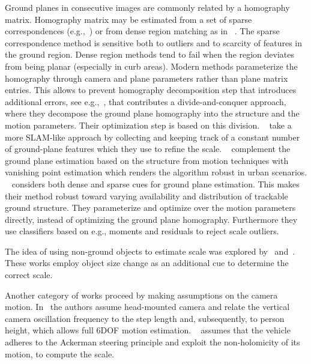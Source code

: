Ground planes in consecutive images are commonly related by a
homography matrix. Homography matrix may be estimated from a set of
sparse correspondences (e.g.,~\cite{song2014robust}) or from dense
region matching as in ~\cite{7995955}.  The sparse correspondence
method is sensitive both to outliers and to scarcity of features in
the ground region.  Dense region methods tend to fail when the region
deviates from being planar (especially in curb areas). Modern methods
parameterize the homography through camera and plane parameters rather
than plane matrix entries.  This allows to prevent homography
decomposition step that introduces additional errors, see
e.g.,~\cite{zhou2016reliable}, that contributes a divide-and-conquer
approach, where they decompose the ground plane homography into the
structure and the motion parameters.  Their optimization step is based
on this division.  ~\cite{kitt2011monocular} take a more SLAM-like
approach by collecting and keeping track of a constant number of
ground-plane features which they use to refine the scale.
~\cite{grater2015robust} complement the ground plane estimation based
on the structure from motion techniques with vanishing point
estimation which renders the algorithm robust in urban
scenarios. ~\cite{7995955} considers both dense and sparse cues for
ground plane estimation.  This makes their method robust toward
varying availability and distribution of trackable ground structure.
They parameterize and optimize over the motion parameters directly,
instead of optimizing the ground plane homography.  Furthermore they
use classifiers based on e.g., moments and residuals to reject scale
outliers.

The idea of using non-ground objects to estimate scale was explored
by~\cite{song2014robust} and~\cite{frost2016}.  These works employ
object size change as an additional cue to determine the correct scale.

Another category of works proceed by making assumptions on the camera
motion. In~\cite{gutierrez2012full} the authors assume head-mounted
camera and relate the vertical camera oscillation frequency to the step
length and, subsequently, to person height, which allows full 6DOF
motion estimation. ~\cite{scaramuzza2009absolute} assumes that the
vehicle adheres to the Ackerman steering principle and exploit the
non-holomicity of its motion, to compute the scale.


